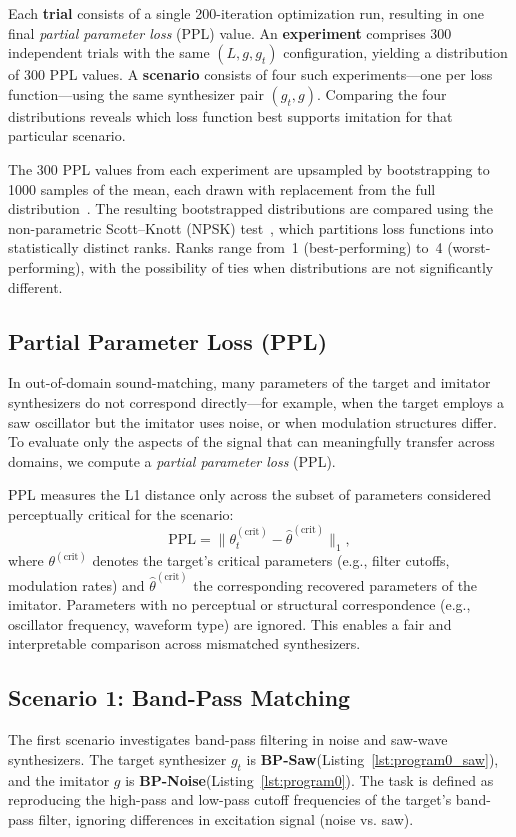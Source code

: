 \documentclass[runningheads]{llncs}
\providecommand{\gls}[1]{#1}
\newcommand{\BPNoise}{\textbf{BP-Noise}\xspace}
\newcommand{\BPSaw}{\textbf{BP-Saw}\xspace}
\begin{document}
Each \textbf{trial} consists of a single 200-iteration optimization run, resulting in one final \textit{partial parameter loss} (PPL) value.  
An \textbf{experiment} comprises 300 independent trials with the same $(L, g, g_t)$ configuration, yielding a distribution of 300 PPL values.  
A \textbf{scenario} consists of four such experiments—one per loss function—using the same synthesizer pair $(g_t, g)$.  
Comparing the four distributions reveals which loss function best supports imitation for that particular scenario.

The 300 PPL values from each experiment are upsampled by bootstrapping to 1000 samples of the mean, each drawn with replacement from the full distribution~\cite{tibshirani1993introduction,chernick2011bootstrap}.  
The resulting bootstrapped distributions are compared using the non-parametric Scott–Knott (\gls{NPSK}) test~\cite{tantithamthavorn2017mvt,tantithamthavorn2018optimization}, which partitions loss functions into statistically distinct ranks.  
Ranks range from~1 (best-performing) to~4 (worst-performing), with the possibility of ties when distributions are not significantly different.

\subsection{Partial Parameter Loss (PPL)}
In out-of-domain sound-matching, many parameters of the target and imitator synthesizers do not correspond directly—for example, when the target employs a saw oscillator but the imitator uses noise, or when modulation structures differ.  
To evaluate only the aspects of the signal that can meaningfully transfer across domains, we compute a \emph{partial parameter loss} (PPL).  

PPL measures the L1 distance only across the subset of parameters considered perceptually critical for the scenario:
\begin{equation}
\mathrm{PPL} = \| \theta^{(\mathrm{crit})}_t - \hat{\theta}^{(\mathrm{crit})} \|_1,
\end{equation}
where $\theta^{(\mathrm{crit})}$ denotes the target’s critical parameters (e.g., filter cutoffs, modulation rates) and $\hat{\theta}^{(\mathrm{crit})}$ the corresponding recovered parameters of the imitator.  
Parameters with no perceptual or structural correspondence (e.g., oscillator frequency, waveform type) are ignored.  
This enables a fair and interpretable comparison across mismatched synthesizers.

\subsection{Scenario 1: Band-Pass Matching}
The first scenario investigates band-pass filtering in noise and saw-wave synthesizers.  
The target synthesizer $g_t$ is \BPSaw (Listing~\ref{lst:program0_saw}), and the imitator $g$ is \BPNoise (Listing~\ref{lst:program0}).  
The task is defined as reproducing the high-pass and low-pass cutoff frequencies of the target’s band-pass filter, ignoring differences in excitation signal (noise vs. saw).
\end{document}
